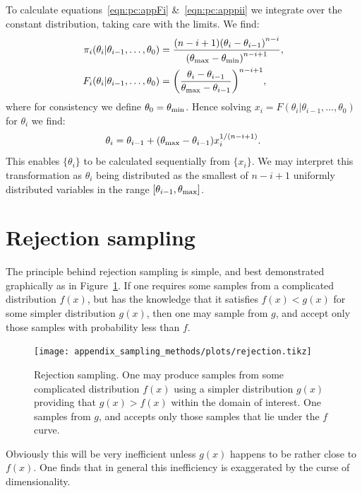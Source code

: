 To calculate equations~\eqref{eqn:pc:appFi} \&~\ref{eqn:pc:apppii} we integrate over the constant distribution, taking care with the limits. We find:
\begin{align}
  \pi_i(\theta_i|\theta_{i-1},\ldots,\theta_0) &= \frac{(n-i+1){(\theta_i-\theta_{i-1})}^{n-i}}{{(\theta_{\mathrm{max}}-\theta_{\mathrm{min}})}^{n-i+1}},\\
  F_i(\theta_i|\theta_{i-1},\ldots,\theta_0) &= {\left(\frac{\theta_i-\theta_{i-1}}{\theta_{\mathrm{max}}-\theta_{i-1}}\right)}^{n-i+1},
  \label{eqn:pc:sorted_uniform_calc}
\end{align}
where for consistency we define $\theta_0 = \theta_{\mathrm{min}}$. Hence solving $x_i=F(\theta_i|\theta_{i-1},\ldots,\theta_0)$ for $\theta_i$ we find:
\begin{equation}
  \theta_i = \theta_{i-1}+ (\theta_{\mathrm{max}}-\theta_{i-1})x_i^{1/(n-i+1)}.
  \label{eqn:pc:sorted_uniform_trans}
\end{equation}
This enables $\{\theta_i\}$ to be calculated sequentially from $\{x_i\}$. We may interpret this transformation as $\theta_i$ being distributed as the smallest of $n-i+1$ uniformly distributed variables in the range $[\theta_{i-1},\theta_{\mathrm{max}}]$.



\section{Rejection sampling}
\label{sec:sm:rejection}

The principle behind rejection sampling is simple, and best demonstrated graphically as in Figure~\ref{fig:sm:rej}. If one requires some samples from a complicated distribution $f(x)$, but has the knowledge that it satisfies $f(x)<g(x)$ for some simpler distribution $g(x)$, then one may sample from $g$, and accept only those samples with probability less than $f$. 

\begin{figure}[tp]
  \centering
  \texttt{[image: appendix\_sampling\_methods/plots/rejection.tikz]}
  \caption{Rejection sampling. One may produce samples from some complicated distribution $f(x)$ using a simpler distribution $g(x)$ providing that $g(x)>f(x)$ within the domain of interest. One samples from $g$, and accepts only those samples that lie under the $f$ curve.\label{fig:sm:rej}}
\end{figure}

Obviously this will be very inefficient unless $g(x)$ happens to be rather close to $f(x)$. One finds that in general this inefficiency is exaggerated by the curse of dimensionality.

